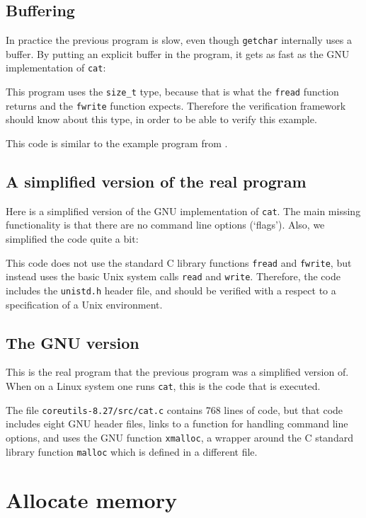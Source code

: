 \documentclass{article}
\begin{document}
\subsection{Buffering}
In practice the previous program is slow, even though \texttt{getchar} internally uses a buffer.
By putting an explicit buffer in the program, it gets as fast as the GNU implementation of \texttt{cat}:

This program uses the \lstinline|size_t| type, because that is what the \lstinline|fread| function returns and the \lstinline|fwrite| function expects.
Therefore the verification framework should know about this type, in order to be able to verify this example.

This code is similar to the example program from \cite{gun:myr:kum:nor:17}.

\subsection{A simplified version of the real program}
Here is a simplified version of the GNU implementation of \texttt{cat}.
The main missing functionality is that there are no command line options (`flags').
Also, we simplified the code quite a bit:

This code does not use the standard C library functions
\texttt{fread} and \texttt{fwrite}, but instead
uses the basic Unix system calls \texttt{read} and \texttt{write}.
Therefore, the code includes the \texttt{unistd.h} header file,
and should be verified with a respect to a specification of a Unix
environment.

\subsection{The GNU version}
This is the real program that the previous program was a simplified version of.
When on a Linux system one runs \texttt{cat}, this is the code that is
executed.

The file \texttt{coreutils-8.27/src/cat.c} contains 768 lines of code,
but that code includes eight GNU header files,
links to a function for handling command line options, and uses
the GNU function \texttt{xmalloc}, a wrapper around the C standard library function
\texttt{malloc} which is defined in a different file.
\addtocounter{lstlisting}{1}

\section{Allocate memory}
\end{document}
